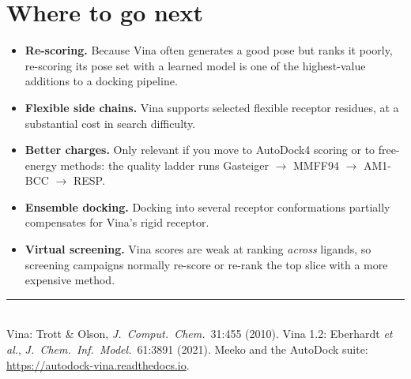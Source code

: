 \documentclass[11pt,a4paper]{article}
\begin{document}
\section{Where to go next}

\begin{itemize}[leftmargin=1.3em, itemsep=3pt]
  \item \textbf{Re-scoring.} Because Vina often generates a good pose but ranks it
        poorly, re-scoring its pose set with a learned model is one of the
        highest-value additions to a docking pipeline.
  \item \textbf{Flexible side chains.} Vina supports selected flexible receptor
        residues, at a substantial cost in search difficulty.
  \item \textbf{Better charges.} Only relevant if you move to AutoDock4 scoring or
        to free-energy methods: the quality ladder runs Gasteiger $\rightarrow$
        MMFF94 $\rightarrow$ AM1-BCC $\rightarrow$ RESP.
  \item \textbf{Ensemble docking.} Docking into several receptor conformations
        partially compensates for Vina's rigid receptor.
  \item \textbf{Virtual screening.} Vina scores are weak at ranking \emph{across}
        ligands, so screening campaigns normally re-score or re-rank the top slice
        with a more expensive method.
\end{itemize}

\vspace{1em}
\noindent\rule{\linewidth}{0.4pt}\\[4pt]
{\small Vina: Trott \& Olson, \emph{J.\ Comput.\ Chem.}\ 31:455 (2010).
Vina 1.2: Eberhardt \emph{et al.}, \emph{J.\ Chem.\ Inf.\ Model.}\ 61:3891 (2021).
Meeko and the AutoDock suite: \url{https://autodock-vina.readthedocs.io}.}
\end{document}
